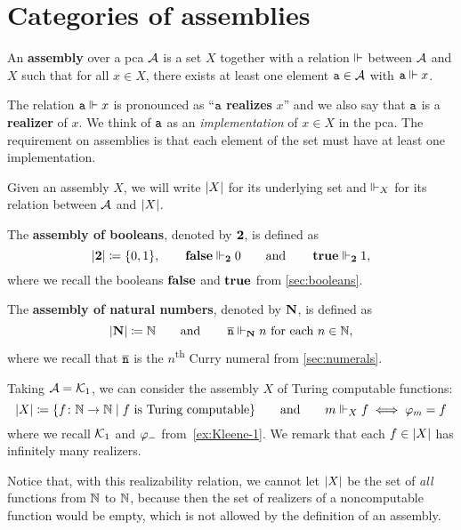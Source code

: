 \chapter{Categories of assemblies}\label{chap:assemblies}


\begin{definition}[Assembly]
  An \textbf{assembly} over a pca \(\AA\) is a set \(X\) together with a
  relation \({\realizes}\) between \(\AA\) and \(X\) such that for all
  \(x \in X\), there exists at least one element \(\pca{a} \in \AA\) with
  \(\pca{a} \realizes x\).
\end{definition}

The relation \(\pca{a} \realizes x\) is pronounced as ``\(\pca{a}\)
\textbf{realizes} \(x\)'' and we also say that \(\pca{a}\) is a
\textbf{realizer} of \(x\). We think of \(\pca{a}\) as an \emph{implementation}
of \(x \in X\) in the pca.
%
The requirement on assemblies is that each element of the set must have at least
one implementation.

\begin{notation}
  Given an assembly \(X\), we will write \(\carrier{X}\) for its underlying set
  and \(\realizes_X\) for its relation between \(\AA\) and \(\carrier{X}\).
\end{notation}

\begin{example}
  The \textbf{assembly of booleans}, denoted by \(\Two\), is defined as
  \[
    \carrier{\Two} \coloneqq \set{0,1},
    \quad\quad
    \pcafalse \realizes_\Two 0
    \quad\quad
    \text{and}\quad\quad
    \pcatrue \realizes_\Two 1,
  \]
  where we recall the booleans \(\pcafalse\) and \(\pcatrue\) from \cref{sec:booleans}.
\end{example}

\begin{example}
  The \textbf{assembly of natural numbers}, denoted by \(\NatAsm\), is defined as
  \[
    \carrier{\NatAsm} \coloneqq \Nat
    \quad\quad\text{and}\quad\quad
    \numeral{n} \realizes_\NatAsm n \text{ for each \(n \in \Nat\)},
  \]
  where we recall that \(\numeral{n}\) is the \(n\)\textsuperscript{th} Curry
  numeral from \cref{sec:numerals}.
\end{example}

\begin{example}
  Taking \(\AA = \Kone\), we can consider the assembly \(X\) of Turing computable functions:
  \[
    \carrier{X} \coloneqq \set{f \colon \Nat \to \Nat \mid f \text{ is Turing computable}}
    \quad\quad\text{and}\quad\quad
    m \realizes_X f \iff \prenum{m} = f
  \]
  where we recall \(\Kone\) and \(\prenum{-}\) from~\cref{ex:Kleene-1}.
  We remark that each \(f \in \carrier{X}\) has infinitely many realizers.

  Notice that, with this realizability relation, we cannot let \(\carrier{X}\)
  be the set of \emph{all} functions from \(\Nat\) to \(\Nat\), because then the
  set of realizers of a noncomputable function would be empty, which is not
  allowed by the definition of an assembly.
\end{example}

